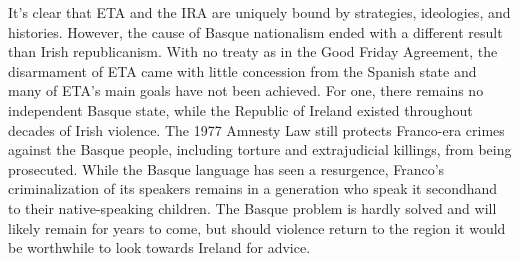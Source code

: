 \documentclass[basque,american]{../../../coursework}
\begin{document}
It's clear that ETA and the IRA are uniquely bound by strategies, ideologies,
and histories. However, the cause of Basque nationalism ended with a different
result than Irish republicanism. With no treaty as in the Good Friday
Agreement, the disarmament of ETA came with little concession from the Spanish
state and many of ETA's main goals have not been achieved. For one, there
remains no independent Basque state, while the Republic of Ireland existed
throughout decades of Irish violence. The 1977 Amnesty Law still protects
Franco-era crimes against the Basque people, including torture and
extrajudicial killings, from being prosecuted. While the Basque language has
seen a resurgence, Franco's criminalization of its speakers remains in a
generation who speak it secondhand to their native-speaking children. The
Basque problem is hardly solved and will likely remain for years to come,
but should violence return to the region it
would be worthwhile to look towards Ireland for advice.

\printbibliography
\end{document}
